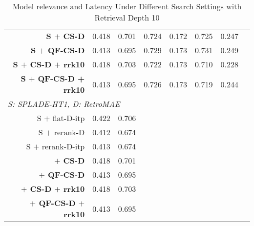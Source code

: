 {\begin{table*}[htbp]
\begin{small}
\begin{tabular}{ r r r | r r | r r | r}
            \bf S $+$ CS-D &  0.418 &0.701&0.724&0.172&0.725&0.247 & \\
             \bf S $+$ QF-CS-D &  0.413 &0.695&0.729 &0.173&0.731&0.249&\\
            \bf S $+$ CS-D $+$  rrk10 & 0.418 & 0.703 & 0.722 & 0.173 & 0.710 & 0.228 &  \\
       \bf S $+$ QF-CS-D + rrk10 &  0.413 & 0.695 & 0.726 & 0.173 & 0.719 & 0.244 & \\
 \multicolumn{ 8}{l}{\it  S: SPLADE-HT1, D: RetroMAE}  \\
            S $+$ flat-D-itp  & 0.422 & 0.706 & &&&& \\
            S $+$ rerank-D &  0.412 & 0.674 &&&&&  \\
            S $+$ rerank-D-itp &  0.413 & 0.674 &&&&&  \\
            \bf $+$ CS-D &  0.418 & 0.701 &  &  &  & & \\
            \bf $+$ QF-CS-D &  0.413 & 0.695 &  &   & & & \\
           \bf $+$ CS-D $+$ rrk10 &  0.418 & 0.703 &  &  & &  & \\
            \bf $+$ QF-CS-D $+$ rrk10 &  0.413 & 0.695 &&&&& \\
            \hline
			\hline\hline
		\end{tabular}
		\end{small}
	\caption{Model relevance and Latency Under Different Search Settings with Retrieval Depth 10
}
	\label{tab:main10}
\end{table*}
}

